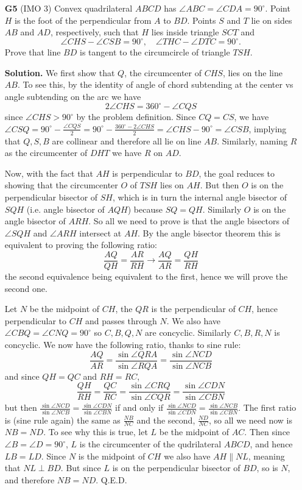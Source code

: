 \documentclass[11pt,a4paper]{article}
\begin{document}
\begin{enumerate}
	\item [\textbf{G5}] (IMO 3) Convex quadrilateral $ABCD$ has $\angle ABC = \angle CDA = 90^{\circ}$. Point $H$ is the foot of the perpendicular from $A$ to $BD$. Points $S$ and $T$ lie on sides $AB$ and $AD$, respectively, such that $H$ lies inside triangle $SCT$ and \[
	\angle CHS - \angle CSB = 90^{\circ}, \quad \angle THC - \angle DTC = 90^{\circ}. \] Prove that line $BD$ is tangent to the circumcircle of triangle $TSH$.
	
	\textbf{Solution.} We first show that $Q$, the circumcenter of $CHS$, lies on the line $AB$. To see this, by the identity of angle of chord subtending at the center vs angle subtending on the arc we have 
	\[2\angle CHS = 360^{\circ} - \angle CQS
	\]
	since $\angle CHS>90^{\circ}$ by the problem definition. 
	Since $CQ=CS$, we have $\angle CSQ = 90^{\circ} - \frac{\angle CQS}{2} = 90^{\circ} - \frac{360^{\circ} - 2\angle CHS}{2} = \angle CHS - 90^{\circ} = \angle CSB$, implying that $Q, S, B$ are collinear and therefore all lie on line $AB$. Similarly, naming $R$ as the circumcenter of $DHT$ we have $R$ on $AD$. 
	
	Now, with the fact that $AH$ is perpendicular to $BD$, the goal reduces to showing that the circumcenter $O$ of $TSH$ lies on $AH$. But then $O$ is on the perpendicular bisector of $SH$, which is in turn the internal angle bisector of $SQH$ (i.e. angle bisector of $AQH$) because $SQ=QH$. Similarly $O$ is on the angle bisector of $ARH$. So all we need to prove is that the angle bisectors of $\angle SQH$ and $\angle ARH$ intersect at $AH$. By the angle bisector theorem this is equivalent to proving the following ratio: 
	\[
	\frac{AQ}{QH} = \frac{AR}{RH}\to \frac{AQ}{AR} = \frac{QH}{RH}
	\]
	the second equivalence being equivalent to the first, hence we will prove the second one. 
	
	Let $N$ be the midpoint of $CH$, the $QR$ is the perpendicular of $CH$, hence perpendicular to $CH$ and passes through $N$. We also have $\angle CBQ=\angle CNQ = 90^{\circ}$ so $C, B, Q, N$ are concyclic. Similarly $C, B, R, N$ is concyclic. We now have the following ratio, thanks to sine rule: 
	\[
	\frac{AQ}{AR} = \frac{\sin\angle QRA}{\sin\angle RQA} = \frac{\sin\angle NCD}{\sin\angle NCB}
	\]
	and since $QH=QC$ and $RH=RC$, 
	\[
	\frac{QH}{RH} = \frac{QC}{RC} = \frac{\sin\angle CRQ}{\sin\angle CQR} = \frac{\sin\angle CDN}{\sin\angle CBN}
	\]
	but then $\frac{\sin\angle NCD}{\sin\angle NCB} = \frac{\sin\angle CDN}{\sin\angle CBN}$ if and only if $\frac{\sin\angle NCD}{\sin\angle CDN} = \frac{\sin\angle NCB}{\sin\angle CBN}$. The first ratio is (sine rule again) the same as $\frac{NB}{NC}$ and the second, $\frac{ND}{NC}$, so all we need now is $NB=ND$. 
	To see why this is true, let $L$ be the midpoint of $AC$. Then since $\angle B=\angle D=90^{\circ}$, $L$ is the circumcenter of the qudrilateral $ABCD$, and hence $LB=LD$. Since $N$ is the midpoint of $CH$ we also have $AH\parallel NL$, meaning that $NL\perp BD$. But since $L$ is on the perpendicular bisector of $BD$, so is $N$, and therefore $NB=ND$. Q.E.D. 
	

\end{enumerate}
\end{document}
